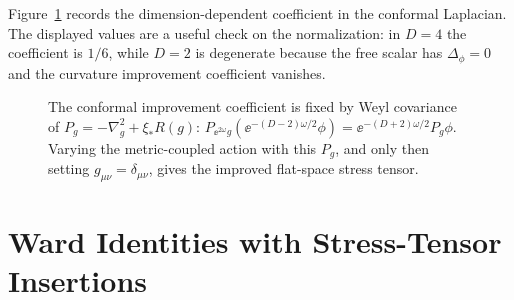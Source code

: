 Figure~\ref{fig:stress-improvement-curvature} records the dimension-dependent
coefficient in the conformal Laplacian.  The displayed values are a useful
check on the normalization: in \(D=4\) the coefficient is \(1/6\), while
\(D=2\) is degenerate because the free scalar has \(\Delta_\phi=0\) and the
curvature improvement coefficient vanishes.

\begin{figure}[H]
  \centering
  \caption{The conformal improvement coefficient is fixed by Weyl covariance
  of \(P_g=-\nabla_g^2+\xi_\ast R(g)\):
  \(P_{\ee^{2\omega}g}(\ee^{-(D-2)\omega/2}\phi)
  =\ee^{-(D+2)\omega/2}P_g\phi\).  Varying the metric-coupled action with
  this \(P_g\), and only then setting \(g_{\mu\nu}=\delta_{\mu\nu}\), gives the
  improved flat-space stress tensor.}
  \label{fig:stress-improvement-curvature}
\end{figure}

\section{Ward Identities with Stress-Tensor Insertions}

